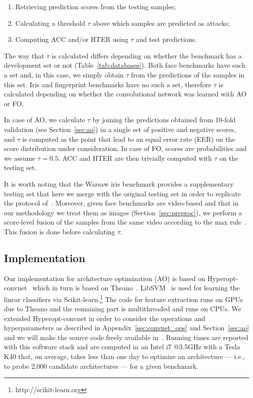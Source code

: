 \begin{enumerate}
\item Retrieving prediction scores from the testing samples;
\item Calculating a threshold $\tau$ above which samples are predicted as attacks;
\item Computing ACC and/or HTER using $\tau$ and test predictions.
\end{enumerate}

The way that $\tau$ is calculated differs depending on whether the benchmark has a development set or not (Table~\ref{tab:databases}). Both face benchmarks have such a set and, in this case, we simply obtain $\tau$ from the predictions of the samples in this set. 
Iris and fingerprint benchmarks have no such a set, therefore $\tau$ is calculated depending on whether the convolutional network was learned with AO or FO.

In case of AO, we calculate $\tau$ by joining the predictions obtained from 10-fold validation (see Section~\ref{sec:ao}) in a single set of positive and negative scores, and $\tau$ is computed as the point that lead to an equal error rate (EER) on the score distribution under consideration. 
In case of FO, scores are probabilities and we assume $\tau=0.5$. ACC and HTER are then trivially computed with $\tau$ on the testing set.

It is worth noting that the Warsaw iris benchmark provides a supplementary testing set that here we merge with the original testing set in order to replicate the protocol of~\cite{LivDet:Iris:2013}.
Moreover, given face benchmarks are video-based and that in our methodology we treat them as images (Section~\ref{sec:preproc}),
we perform a score-level fusion of the samples from the same video according to the max rule~\cite{Ross:HM:2006}. This fusion is done before calculating $\tau$.


\subsection{Implementation}
\label{sec:implementationdetais}

Our implementation for architecture optimization (AO) is based on Hyperopt-convnet~\cite{Bergstra:2013b} which in turn is based on Theano~\cite{Bergstra:SCIPY:2010}.
LibSVM~\cite{Chang:2011} is used for learning the linear classifiers via Scikit-learn.\footnote{http://scikit-learn.org}
The code for feature extraction runs on GPUs due to Theano and the remaining part is multithreaded and runs on CPUs.
We extended Hyperopt-convnet in order to consider the operations and hyperparameters as described in Appendix~\ref{sec:convnet_ops} and Section~\ref{sec:ao} and we will make the source code freely available in~\cite{Chiachia:2014b}.
Running times are reported with this software stack and are computed in an Intel i7 @3.5GHz with a Tesla K40 that, on average, takes less than one day to optimize an architecture --- i.e., to probe 2,000 candidate architectures --- for a given benchmark.

